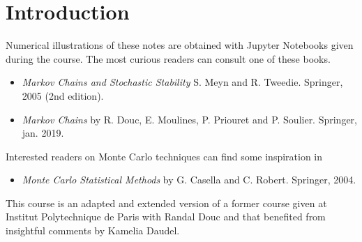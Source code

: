\documentclass[english,graybox,envcountchap,envcountsame,sectrefs,shortlabels]{svmono}
\theoremstyle{style}
\begin{document}
\chapter*{Introduction}
Numerical illustrations of these notes are obtained with Jupyter Notebooks given during the course. %
The most curious readers can consult one of these books.
\begin{itemize}
\item {\em Markov Chains and Stochastic Stability} S. Meyn and R. Tweedie. Springer, 2005 (2nd edition).
\item {\em Markov Chains} by R. Douc, E. Moulines, P. Priouret and P. Soulier. Springer, jan. 2019.
\end{itemize}
Interested readers on Monte Carlo techniques can find some inspiration in
\begin{itemize}
\item {\em Monte Carlo Statistical Methods} by G. Casella and C. Robert. Springer, 2004.
\end{itemize}
This course is an adapted and extended version of a former course given at Institut Polytechnique de Paris with Randal Douc and that benefited from insightful comments by Kamelia Daudel.

\clearpage
\newpage
\end{document}
